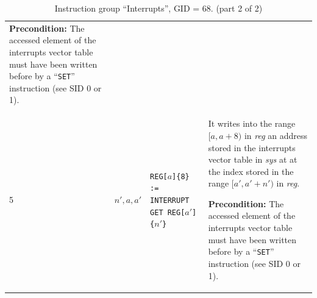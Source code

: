 \documentclass[10pt,twocolumn]{article}
\begin{document}
\begin{table}[!h]
\begin{center}
\begin{tabular}{lp{1.2cm}p{5.5cm}p{7.5cm}}
\textbf{Precondition:} The accessed element of the interrupts vector table must
have been written before by a ``\texttt{SET}'' instruction (see SID 0 or 1). \\

5 & $ n',a,a' $ %
& \texttt{REG[}$ a $\texttt{]\{8\} := INTERRUPT GET REG[}$ a' $\texttt{]\{}$
n' $\texttt{\}} %
& It writes into the range $ [a,a+8) $ in \textit{reg} an address stored in
the interrupts vector table in \textit{sys} at at the index stored in the range
$ [a',a'+n') $ in \textit{reg}.

\textbf{Precondition:} The accessed element of the interrupts vector table must
have been written before by a ``\texttt{SET}'' instruction (see SID 0 or 1). \\

\end{tabular}
\end{center}
\caption{Instruction group ``Interrupts'', GID = 68. (part 2 of 2)}
\end{table}

\clearpage

\end{document}
